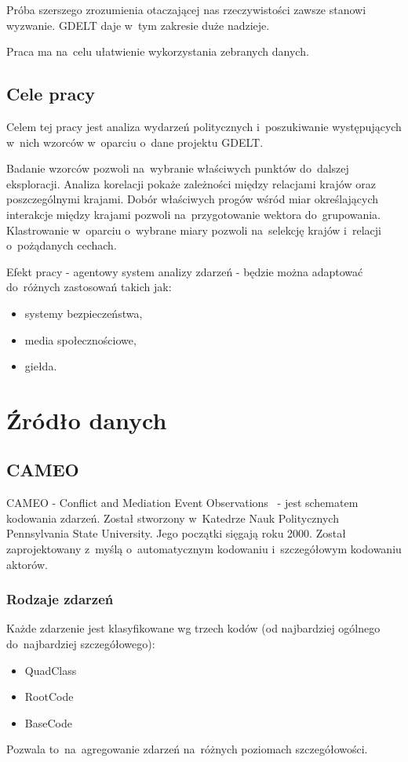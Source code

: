 \documentclass[11pt]{report}
\begin{document}
    Próba szerszego zrozumienia otaczającej nas rzeczywistości zawsze stanowi wyzwanie.
    GDELT daje w~tym zakresie duże nadzieje.

    Praca ma na~celu ułatwienie wykorzystania zebranych danych.


    \section{Cele pracy}\label{sec:cele-pracy}
    Celem tej pracy jest analiza wydarzeń politycznych i~poszukiwanie występujących w~nich wzorców w~oparciu o~dane projektu GDELT.\@

    Badanie wzorców pozwoli na~wybranie właściwych punktów do~dalszej eksploracji.
    Analiza korelacji pokaże zależności między relacjami krajów oraz poszczególnymi krajami.
    Dobór właściwych progów wśród miar określających interakcje między krajami pozwoli na~przygotowanie wektora do~grupowania.
    Klastrowanie w~oparciu o~wybrane miary pozwoli na~selekcję krajów i~relacji o~pożądanych cechach.

    Efekt pracy - agentowy system analizy zdarzeń - będzie można adaptować do~różnych zastosowań takich jak:
    \begin{itemize}
        \item systemy bezpieczeństwa,
        \item media społecznościowe,
        \item giełda.
    \end{itemize}


    \chapter{Źródło danych}\label{ch:źródło}


    \section{CAMEO}\label{sec:cameo}
    CAMEO - Conflict and Mediation Event Observations~\cite{GDELTDocumentation} - jest schematem kodowania zdarzeń.
    Został stworzony w~Katedrze Nauk Politycznych Pennsylvania State University.
    Jego początki sięgają roku 2000.
    Został zaprojektowany z~myślą o~automatycznym kodowaniu i~szczegółowym kodowaniu aktorów.

    \subsection{Rodzaje zdarzeń}
    Każde zdarzenie jest klasyfikowane wg trzech kodów (od najbardziej ogólnego do~najbardziej szczegółowego):
    \begin{itemize}
        \item QuadClass
        \item RootCode
        \item BaseCode
    \end{itemize}
    Pozwala to~na~agregowanie zdarzeń na~różnych poziomach szczegółowości.
\end{document}
